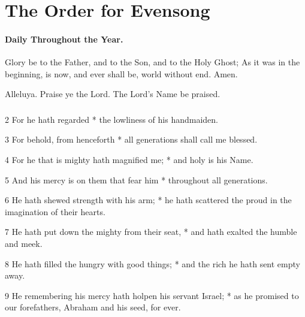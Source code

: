 \chapter{The Order for Evensong}
\subsubsection{Daily Throughout the Year.}
\bigskip
{}


\V Glory be to the Father, and to the Son, and to the Holy Ghost;  \R As it was in the beginning, is now, and ever shall be, world without end. Amen.

Alleluya.
\V Praise ye the Lord.  \R The Lord's Name be praised.

\bigskip


\subsection{}


2 For he hath regarded * the lowliness of his handmaiden.

3 For behold, from henceforth * all generations shall call me blessed.

4 For he that is mighty hath magnified me; * and holy is his Name.

5 And his mercy is on them that fear him * throughout all generations.

6 He hath shewed strength with his arm; * he hath scattered the proud in the imagination of their hearts.

7 He hath put down the mighty from their seat, * and hath exalted the humble and meek.

8 He hath filled the hungry with good things; * and the rich he hath sent empty away.

9 He remembering his mercy hath holpen his servant Israel; * as he promised to our forefathers, Abraham and his seed, for ever.

